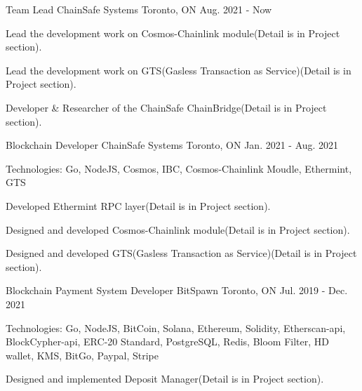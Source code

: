 \vspace{-2.0em}
\begin{cventries}
    \cventry
    {Team Lead}
    {ChainSafe Systems}
    {Toronto, ON}
    {Aug. 2021 - Now}
    {
      \begin{cvitems}
        \item {Lead the development work on Cosmos-Chainlink module(Detail is in Project section).}
        \item {Lead the development work on GTS(Gasless Transaction as Service)(Detail is in Project section).}
        \item {Developer \& Researcher of the ChainSafe ChainBridge(Detail is in Project section).}
      \end{cvitems}
    }
    
    \cventry
    {Blockchain Developer}
    {ChainSafe Systems}
    {Toronto, ON}
    {Jan. 2021 - Aug. 2021}
    {
      \begin{cvitems}
        \item {Technologies: Go, NodeJS, Cosmos, IBC, Cosmos-Chainlink Moudle, Ethermint, GTS}
        \item {Developed Ethermint RPC layer(Detail is in Project section).}
        \item {Designed and developed Cosmos-Chainlink module(Detail is in Project section).}
        \item {Designed and developed GTS(Gasless Transaction as Service)(Detail is in Project section).}
      \end{cvitems}
    }
    
    \cventry
    {Blockchain Payment System Developer}
    {BitSpawn}
    {Toronto, ON}
    {Jul. 2019 - Dec. 2021}
    {
      \begin{cvitems}
        \item {Technologies: Go, NodeJS, BitCoin, Solana, Ethereum, Solidity, Etherscan-api, BlockCypher-api, ERC-20 Standard, PostgreSQL, Redis, Bloom Filter, HD wallet, KMS, BitGo, Paypal, Stripe}
        \item {Designed and implemented Deposit Manager(Detail is in Project section).}
      \end{cvitems}
    }


\end{cventries}
